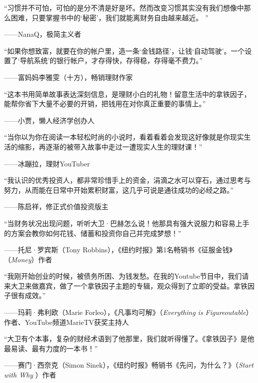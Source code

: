 “习惯并不可怕，可怕的是分不清是好是坏。然而改变习惯其实没有我们想像中那么困难，只要掌握书中的‘秘密’，我们就能离财务自由越来越近。 ”

{\kaishu \hfill ——NanaQ，极简主义者}\vspace{1em}

“如果你想致富，就要在你的帐户里，造一条‘金钱路径’，让钱‘自动驾驶’。一个设置了‘导航系统’的银行帐户，才存得快，存得稳，存得毫不费力。”

{\kaishu \hfill ——富妈妈李雅雯（十方），畅销理财作家}\vspace{1em}

“这本书用简单故事表达深刻信息，是理财小白的礼物！留意生活中的拿铁因子，能帮你省下大量不必要的开销，把钱用在对你真正重要的事情上。”

{\kaishu \hfill ——小贾，懒人经济学创办人}\vspace{1em}

“当你以为你在阅读一本轻松时尚的小说时，看着看着会发现这好像就是你现实生活的缩影，再逐渐的被带入故事中走过一遭现实人生的理财课！”

{\kaishu \hfill ——冰蹦拉，理财YouTuber}\vspace{1em}

“我认识的优秀投资人，都非常珍惜手上的资金，涓滴之水可以穿石，通过思考与努力，从而能在日常中开始累积财富，这几乎可说是通往成功的必经之路。”

{\kaishu \hfill ——陈启祥，修正式价值投资版主}\vspace{1em}

“当财务状况出现问题，听听大卫·巴赫怎么说！他那具有强大说服力和容易上手的方案会教你如何花钱、储蓄和投资你自己并完成梦想！”

{\kaishu \hfill ——托尼·罗宾斯（Tony Robbins），《纽约时报》第1名畅销书《征服金钱》（\textit{Money}）作者}\vspace{1em}

“我刚开始创业的时候，被债务所困、为钱发愁。在我的Youtube节目中，我们请来大卫来做嘉宾，做了一个拿铁因子主题的专辑，观众得到了立即的受益。拿铁因子很有成效。”

{\kaishu \hfill ——玛莉·弗利欧（Marie Forleo），《凡事均可解》（\textit{Everything is Figureoutable}）作者、YouTube频道MarieTV获奖主持人}\vspace{1em}

“大卫有个本事，复杂的财经术语到了他那里，我们就听得懂了。《拿铁因子》是他最易读、最有力度的一本书！”

{\kaishu \hfill ——赛门·西奈克（Simon Sinek），《纽约时报》畅销书《先问，为什么？》（\textit{Start with Why }）作者}\vspace{1em}

